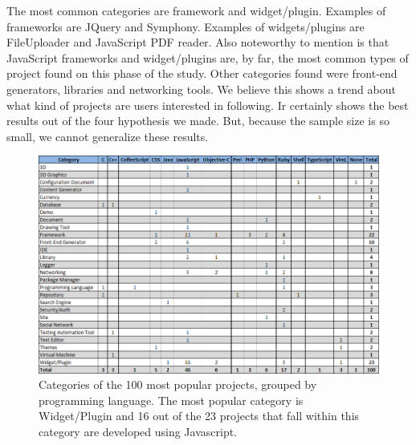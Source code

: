 The most common categories are framework and widget/plugin. Examples of frameworks are JQuery and Symphony. Examples of widgets/plugins are FileUploader and JavaScript PDF reader. Also noteworthy to mention is that JavaScript frameworks and widget/plugins are, by far, the most common types of project found on this phase of the study. Other categories found were front-end generators, libraries and networking tools. We believe this shows a trend about what kind of projects are users interested in following. Ir certainly shows the best results out of the four hypothesis we made. But, because the sample size is so small, we cannot generalize these results.
\begin{figure}[ht]
	\centering
	\includegraphics[width=\textwidth]{./img/categories.png}
	\caption{Categories of the 100 most popular projects, grouped by programming language. The most popular category is Widget/Plugin and 16 out of the 23 projects that fall within this category are developed using Javascript.}
	\label{fig:categories}
\end{figure}